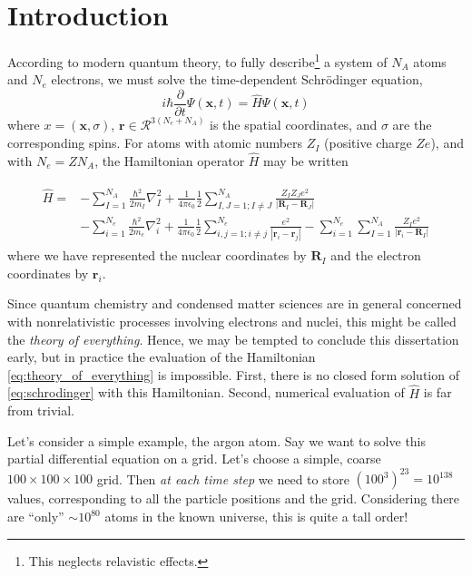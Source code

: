 \chapter{Introduction}
\label{chap:intro}

According to modern quantum theory, to fully describe\footnote{This neglects relavistic effects.} a system of $N_A$ atoms and $N_e$ electrons, we must solve the time-dependent Schr\"odinger equation,
\begin{equation}
    \label{eq:schrodinger}
    i \hbar \frac{\partial}{\partial t} \Psi(\bm{x}, t)
    = \hat{H} \Psi(\bm{x}, t)
\end{equation}
where $x=(\bm{x}, \sigma)$, $\bm r\in\mathcal{R}^{3(N_e+N_A)}$ is the spatial coordinates, and $\sigma$ are the corresponding spins. For atoms with atomic numbers $Z_I$ (positive charge $Ze$), and with $N_e=ZN_A$, the Hamiltonian operator $\hat H$ may be written

\begin{align}
\begin{split}
\label{eq:theory_of_everything}
\hat H =& -\sum_{I=1}^{N_A}\frac{\hbar^2}{2m_I} \nabla^2_I
+ \frac 1{4\pi\epsilon_0} \frac 12\sum_{I,J=1;I\neq J}^{N_A} \frac{Z_IZ_Je^2}{|\bm R_I-\bm R_J|} \\
&- \sum_{i=1}^{N_e} \frac{\hbar^2}{2m_e} \nabla^2_i
+ \frac 1{4\pi\epsilon_0} \frac 12\sum_{i,j=1;i\neq j}^{N_e} \frac{e^2}{|\bm r_i-\bm r_j|}
- \sum_{i=1}^{N_e} \sum_{I=1}^{N_A} \frac{Z_I e^2}{|\bm r_i-\bm R_I|}
\end{split}
\end{align}
where we have represented the nuclear coordinates by $\bm R_I$ and the electron coordinates by $\bm r_i$.

Since quantum chemistry and condensed matter sciences are in general concerned with nonrelativistic processes involving electrons and nuclei, this might be called the \emph{theory of everything}. Hence, we may be tempted to conclude this dissertation early, but in practice the evaluation of the Hamiltonian \eqref{eq:theory_of_everything} is impossible. First, there is no closed form solution of \eqref{eq:schrodinger} with this Hamiltonian. Second, numerical evaluation of $\hat H$ is far from trivial.

Let's consider a simple example, the argon atom. Say we want to solve this partial differential equation on a grid. Let's choose a simple, coarse $100\times 100\times 100$ grid. Then \emph{at each time step} we need to store $(100^3)^{23}=10^{138}$ values, corresponding to all the particle positions and the grid. Considering there are ``only'' $\sim 10^{80}$ atoms in the known universe,\cite{rydenIntroduction2017} this is quite a tall order!

